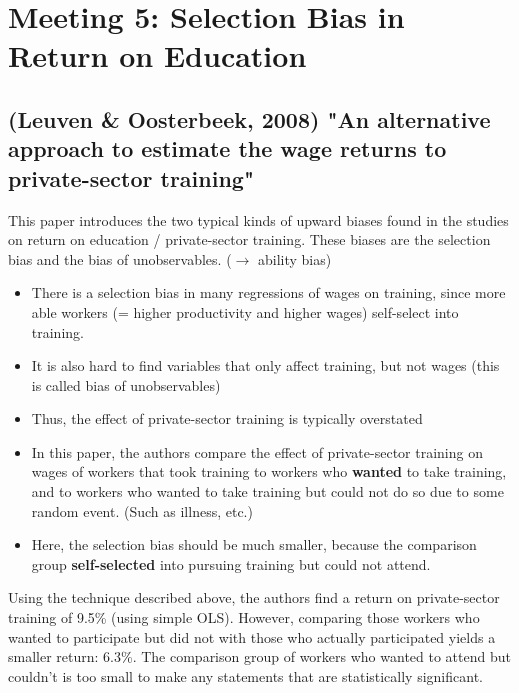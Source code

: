 \documentclass[12pt,a4paper]{article}
\begin{document}

\section{Meeting 5: Selection Bias in Return on Education} %
\label{sec:Meeting 5}
  \subsection{(Leuven \& Oosterbeek, 2008) "An alternative approach to estimate the wage returns to private-sector training"} %
  \label{sub:}
  This paper introduces the two typical kinds of upward biases found in the studies on return on education / private-sector training. These biases
  are the selection bias and the bias of unobservables. ($\rightarrow$ ability bias)
  \begin{itemize}
    \item There is a selection bias in many regressions of wages on training, since more able workers (= higher productivity and higher wages) self-select into training.
    \item It is also hard to find variables that only affect training, but not wages (this is called bias of unobservables)
    \item Thus, the effect of private-sector training is typically overstated
    \item In this paper, the authors compare the effect of private-sector training on wages of workers that took training to workers who \textbf{wanted} to take training, and to workers
          who wanted to take training but could not do so due to some random event. (Such as illness, etc.)
    \item Here, the selection bias should be much smaller, because the comparison group \textbf{self-selected} into pursuing training
          but could not attend. 
  \end{itemize}
  Using the technique described above, the authors find a return on private-sector training of 9.5\% (using simple OLS). 
  However, comparing those workers who wanted to participate but did not with those who actually participated yields a
  smaller return: 6.3\%. The comparison group of workers who wanted to attend but couldn't is too small to make any
  statements that are statistically significant.
\end{document}

